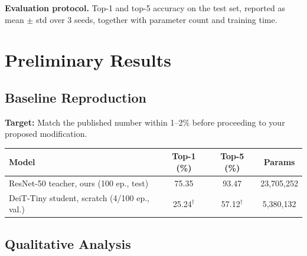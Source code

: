 \documentclass[11pt, letterpaper]{article}
\begin{document}
\textbf{Evaluation protocol.} Top-1 and top-5 accuracy on the test set, reported
as mean $\pm$ std over 3 seeds, together with parameter count and training time.

\section{Preliminary Results}

\subsection{Baseline Reproduction}

\begin{notebox}
\textbf{Target:} Match the published number within 1--2\% before proceeding
to your proposed modification.
\end{notebox}

\begin{center}
\begin{tabular}{lccc}
\toprule
\textbf{Model} & \textbf{Top-1 (\%)} & \textbf{Top-5 (\%)} & \textbf{Params} \\
\midrule
ResNet-50 teacher, ours (100 ep., test) & 75.35 & 93.47 & 23,705,252 \\
DeiT-Tiny student, scratch (4/100 ep., val.) & 25.24$^\dagger$ & 57.12$^\dagger$ & 5,380,132 \\
\bottomrule
\end{tabular}
\end{center}

\subsection{Qualitative Analysis}
\end{document}
